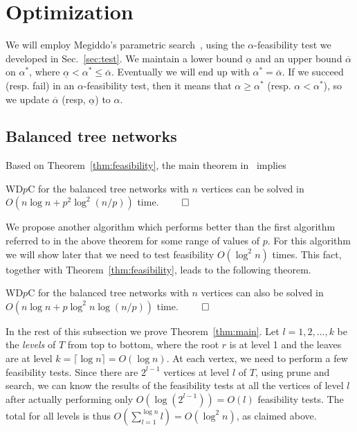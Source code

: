 \documentclass{llncs}
\newcommand{\QED}{\hfill$\qed$}
\begin{document}
{\section{Optimization}\label{sec:optimal}
We will employ Megiddo's parametric search~\cite{megiddo1979},
using the $\alpha$-feasibility test we developed in Sec.~\ref{sec:test}.
We maintain a lower bound $\underline{\alpha}$ and an upper bound $\overline{\alpha}$ on $\alpha^*$,
where $\underline{\alpha}< \alpha^* \leq\overline{\alpha}$.
Eventually we will end up with $\alpha^* =\overline{\alpha}$.
If we succeed (resp. fail) in an $\alpha$-feasibility test, then it means that $\alpha\geq \alpha^*$
(resp. $\alpha< \alpha^*$), so we update $\overline{\alpha}$ (resp, $\underline{\alpha}$)
to $\alpha$.

\subsection{Balanced tree networks}\label{sec:practical}
Based on Theorem~\ref{thm:feasibility},
the main theorem in~\cite{megiddo1979} implies
\begin{theorem}\label{thm:practical}
WD$p$C for the balanced tree networks with $n$ vertices can be solved in 
$O(n\log n + p^2\log^2(n/p))$ time.
\QED
\end{theorem}

We propose another algorithm which performs better than the first algorithm
referred to in the above theorem for some range of values of $p$.
For this algorithm we will show later that we need to test feasibility $O(\log^2 n)$ times.
This fact, together with Theorem~\ref{thm:feasibility}, leads to the following theorem.
\begin{theorem}\label{thm:main}
WD$p$C for the balanced tree networks with $n$ vertices can also be solved in 
$O(n \log n+p\log^2 n\log (n/p))$ time.
\QED
\end{theorem}

In the rest of this subsection we prove Theorem~\ref{thm:main}.
Let $l=1,2, \ldots,k$ be the {\em levels} of $T$ from top to bottom,
where the root $r$ is at level 1 and  the leaves are at level $k=\lceil \log n\rceil =O(\log n)$.
At each vertex, we need to perform a few feasibility tests.
Since there are $2^{l-1}$ vertices at level $l$ of $T$,
using prune and search, 
we can know the results of the feasibility tests at all the vertices of level $l$
after actually performing only $O(\log (2^{l-1}))=O(l)$ feasibility tests.
The total for all levels is thus $O(\sum_{l=1}^{\log n} l) =O(\log^2 n)$,
as claimed above.

}
\end{document}
